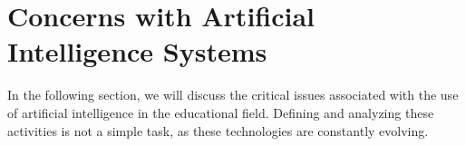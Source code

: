 \documentclass[a4paper,12pt]{article}
\begin{document}

\section{Concerns with Artificial Intelligence Systems}
In the following section, we will discuss the critical issues associated with the use of artificial intelligence in the educational field.
Defining and analyzing these activities is not a simple task, as these technologies are constantly evolving.

\end{document}
